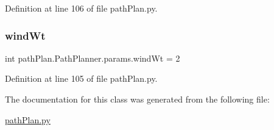 Definition at line 106 of file path\+Plan.\+py.

\mbox{\label{classpath_plan_1_1_path_planner_1_1params_a959f9bbd960b26286d9443ff5fbc9be2}} 
\subsubsection{\texorpdfstring{wind\+Wt}{windWt}}
{\footnotesize\ttfamily int path\+Plan.\+Path\+Planner.\+params.\+wind\+Wt = 2\hspace{0.3cm}{\ttfamily [static]}}



Definition at line 105 of file path\+Plan.\+py.



The documentation for this class was generated from the following file\+:\begin{DoxyCompactItemize}
\item 
\mbox{\hyperlink{path_plan_8py}{path\+Plan.\+py}}\end{DoxyCompactItemize}
